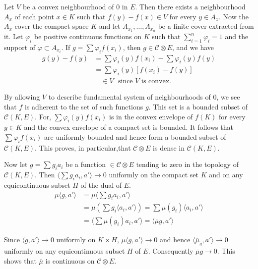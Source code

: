 Let $V$ be a convex neighbourhood of $0$ in $E$. Then there exists a
neighbourhood $A_x$ of each point $x \in K$ such that $f(y) - f(x) \in
V$ for every $y \in A_x$. Now the $A_x$ cover the compact space $K$
and let $ A_{x_{1}},\ldots, A_{x_{n}}$ be a finite cover 
extracted from it. Let $\varphi_i$  be positive continuous functions
on $K$ such that $\sum\limits_{i=1}^{n} \varphi_i=1$ and the support
of $\varphi\subset A_{x_i}$. If $g = \sum \varphi_i f({x_i})$,
then  $g \in \mathscr{C}\otimes E$, and we have  
\begin{align*}
g(y)-f(y) &= \sum \varphi_i(y)f{(x_i)} - \sum \varphi_i(y)f(y)\\
&= \sum\varphi_i(y)[f(x_i) - f(y)]\\
& \quad \in  V  \text{~ since $V$ is convex.}
\end{align*}

By allowing $V$ to describe fundamental system of neighbourhoods of
$0$, we see that $f$ is adherent to the set of such functions
$g$. This set is a bounded subset of $\mathscr{C}(K,E)$. For,
$\sum \varphi_i(y)f(x_i)$ is in the convex envelope of $f(K)$ for every
$y \in K$ and the convex envelope of a compact set is bounded. It
follows that $\sum\varphi_if(x_i)$ are uniformly bounded and hence
form a bounded subset of $\mathscr{C}(K,E)$. This proves, in
particular,that $\mathscr{C} \otimes E$ is dense in $\mathscr{C}
(K,E)$. 

Now let $g = \sum g_i a_i$ be a function $\in \mathscr{C} \otimes E$
tending to zero  
in the topology of $\mathscr{C} (K,E)$. Then $\langle \sum  g_i a_i,
a'\rangle \rightarrow  0$ uniformly on the compact set $K$ and on any
equicontinuous subset $H$ of the dual of $E$. 
\begin{align*}
\mu \langle g, a'\rangle &=  \mu \langle \sum{g_i} a_i, a' \rangle\\
&= \mu(\sum g_i\langle a_i, a'\rangle)  = \sum  \mu(g_i) \langle a_i,
a'\rangle\\ 
&= \langle\sum\mu(g_i) a_i, a'\rangle = \langle \overline{\mu}g, a'
\rangle
\end{align*}\pageoriginale

Since $\langle  g, a' \rangle \rightarrow  0$ uniformly on $K \times
H$, $ \mu  \langle  g, a'  \rangle   \rightarrow  0$ and hence
$\langle \overline{\mu}_g, a' \rangle  \rightarrow 0 $ uniformly on
any equicontinuous subset $H$ of $E$. Consequently $\overline{\mu} g
\rightarrow 0$. This shows that $\overline{\mu}$ is continuous on
$\mathscr{C} \otimes E$. 


